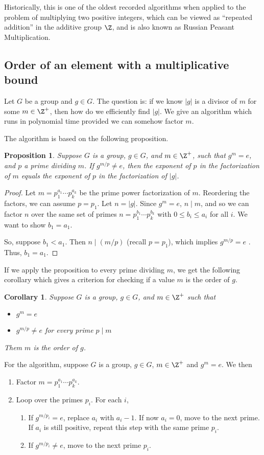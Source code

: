 \documentclass[12pt]{amsart}
\theoremstyle{plain}
\newtheorem{prop}[thm]{Proposition}
\newtheorem{cor}[thm]{Corollary}
\theoremstyle{definition}
\theoremstyle{remark}
\begin{document}
Historically, this is one of the oldest recorded algorithms when
applied to the problem of multiplying two positive integers, which can
be viewed as ``repeated addition'' in the additive group $\Z$, and is
also known as Russian Peasant Multiplication.

\subsection{Order of an element with a multiplicative bound}
Let $G$ be a group and $g\in G$.  The question is: if we know $|g|$ is
a divisor of $m$ for some $m\in\Z^+$, then how do we efficiently find
$|g|$.  We give an algorithm which runs in polynomial time provided we
can somehow factor $m$.  

The algorithm is based on the following proposition.

\begin{prop}
  Suppose $G$ is a group, $g\in G$, and $m\in\Z^+$, such that $g^m=e$,
  and $p$ a prime dividing $m$.  If $g^{m/p}\neq e$, then the exponent
  of $p$ in the factorization of $m$ equals the exponent of $p$ in the
  factorization of $|g|$.
\end{prop}
\begin{proof}
  Let $m=p_1^{a_1}\cdots p_k^{a_k}$ be the prime power factorization
  of $m$.  Reordering the factors, we can assume $p=p_1$.  Let
  $n=|g|$.  Since $g^m=e$, $n\mid m$, and so we can factor $n$ over
  the same set of primes $n=p_1^{b_1}\cdots p_k^{b_k}$ with $0\leq
  b_i\leq a_i$ for all $i$.  We want to show $b_1=a_1$.

  So, suppose $b_1<a_1$.  Then $n\mid (m/p)$ (recall $p=p_1$), which
  implies $g^{m/p}=e$ \con.  Thus, $b_1=a_1$.
\end{proof}

If we apply the proposition to every prime dividing $m$, we get the
following corollary which gives a criterion for checking if a value
$m$ is the order of $g$.
\begin{cor} \label{order-check}
  Suppose $G$ is a group, $g\in G$, and $m\in\Z^+$ such that
  \begin{itemize}
  \item $g^m=e$
  \item $g^{m/p}\neq e$ for every prime $p\mid m$
  \end{itemize}
  Them $m$ is the order of $g$.
\end{cor}

For the algorithm, suppose $G$ is a group, $g\in G$, $m\in\Z^+$ and
$g^m=e$.  We then
\begin{enumerate}
\item Factor $m=p_1^{a_1}\cdots p_k^{a_k}$.
\item Loop over the primes $p_i$.  For each $i$,
  \begin{enumerate}
  \item If $g^{m/p_i}=e$, replace $a_i$ with $a_i-1$.  If now $a_i=0$,
    move to the next prime.  If $a_i$ is still positive, repeat this
    step with the same prime $p_i$.
    \item If $g^{m/p_i}\neq e$, move to the next prime $p_i$.
  \end{enumerate}
\end{enumerate}
\end{document}
